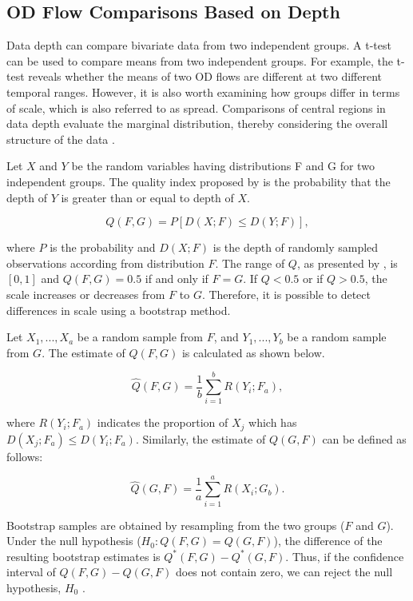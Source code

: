 \documentclass[a4paper,UKenglish]{lipics-v2018}
\begin{document}
\subsection{OD Flow Comparisons Based on Depth}
Data depth can compare bivariate data from two independent groups. A t-test can be used to compare  means from two independent groups. For example, the t-test reveals whether the means of two OD flows are different at two different temporal ranges. However, it is also worth examining how groups differ in terms of scale, which is also referred to as spread. Comparisons of central regions in data depth evaluate the marginal distribution, thereby considering the overall structure of the data \cite{wilcox03MBR}.

Let $X$ and $Y$ be the random variables having distributions F and G for two independent groups. The quality index proposed by \cite{liu93JASA} is the probability that the depth of $Y$ is greater than or equal to depth of $X$. 

\begin{equation*}
Q(F,G) = P[D(X;F) \leq D(Y;F)],
\end{equation*}

where $P$ is the probability and $D(X;F)$ is the depth of randomly sampled observations according from distribution $F$.  The range of $Q$, as presented by \cite{liu93JASA}, is $[0,1]$ and $Q(F,G) = 0.5$ if and only if $F = G$. If $Q < 0.5$  or if $Q > 0.5$, the scale increases or decreases from  $F$ to $G$.   Therefore, it is possible to detect differences in scale using a bootstrap method.

Let $X_1,...,X_a$ be a random sample from $F$, and $Y_1,...,Y_b$ be a random sample from $G$. The estimate of $Q(F,G)$ is calculated as shown below.

\begin{equation*}
\hat{Q}(F,G) =\frac{1}{b} \sum_{i=1}^{b} R(Y_i;F_a),
\end{equation*}

where $R(Y_i;F_a)$ indicates the proportion of $X_j$ which has $D(X_j;F_a) \leq D(Y_i;F_a)$. Similarly, the estimate of $Q(G,F)$ can be defined as follows:

\begin{equation*}
\hat{Q}(G,F) =\frac{1}{a} \sum_{i=1}^{a} R(X_i;G_b).
\end{equation*}

Bootstrap samples are obtained by resampling from the two groups ($F$ and $G$). Under the null hypothesis ($H_0: Q(F,G) = Q(G,F)$), the difference of the resulting bootstrap estimates is $Q^*(F,G) - Q^*(G,F)$. Thus, if the confidence interval of $Q(F,G) - Q(G,F)$ does not contain zero, we can reject the null hypothesis, $H_0$ \cite{liu93JASA,wilcox03MBR}.
\end{document}
